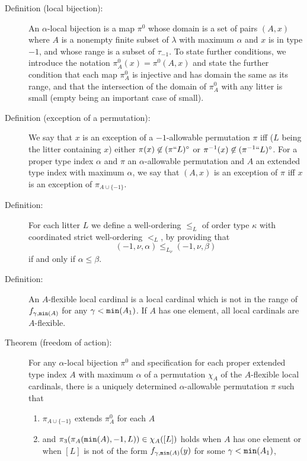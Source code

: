 \documentclass[112pt]{article}
\begin{document}
\begin{description}

\item[Definition (local bijection):]  An $\alpha$-local bijection is a map $\pi^0$ whose domain is a set of pairs $(A,x)$ where $A$ is a nonempty finite subset of $\lambda$ with maximum $\alpha$ and $x$ is in type $-1$,  and whose range is a subset of $\tau_{-1}$.  To state further conditions, we introduce the notation $\pi^0_A(x) = \pi^0(A,x)$ and state the further condition that each map $\pi^0_A$ is injective and has domain the same as its range, and that the intersection of the domain of $\pi^0_A$ with any litter is small (empty being an important case of small).

\item[Definition (exception of a permutation):]  We say that $x$ is an exception of a $-1$-allowable permutation $\pi$ iff ($L$ being the litter containing $x$) either $\pi(x) \not\in (\pi``L)^\circ$ or $\pi^{-1}(x) \not\in (\pi^{-1}``L)^\circ$.  For a proper type index $\alpha$ and $\pi$ an $\alpha$-allowable permutation and $A$ an extended type index with maximum $\alpha$, we say that $(A,x)$ is an exception of $\pi$ iff
$x$ is an exception of $\pi_{A \cup \{-1\}}$.

\item[Definition:]  For each litter $L$ we define a well-ordering $\leq_L$ of order type $\kappa$ with coordinated strict well-ordering $<_L$, by providing that $$(-1,\nu,\alpha)\leq_{L_\nu} (-1,\nu,\beta)$$ if and only if $\alpha\leq \beta$.

\item[Definition:]  An $A$-flexible local cardinal is a local cardinal
which is not in the range of $f_{\gamma,{\tt min}(A)}$ for any $\gamma<{\tt min}(A_1)$.  If $A$ has one element, all local cardinals are $A$-flexible.

\item[Theorem (freedom of action):]  For any $\alpha$-local bijection $\pi^0$ 
and specification for each proper extended type index $A$ with maximum $\alpha$ of a permutation $\chi_A$ of the $A$-flexible local cardinals,
there is a uniquely determined $\alpha$-allowable permutation $\pi$ such that

\begin{enumerate}

\item $\pi_{A\cup \{-1\}}$ extends $\pi^0_A$ for each $A$ 

\item and $\pi_3(\pi_A({\tt min}(A),-1,L))\in \chi_A([L])$ holds when $A$ has one element or when $[L]$ is  not of the form $f_{\gamma,{\tt min}(A)}(y)$ for some $\gamma<{\tt min}(A_1)$, 


\end{enumerate}
\end{description}
\end{document}
